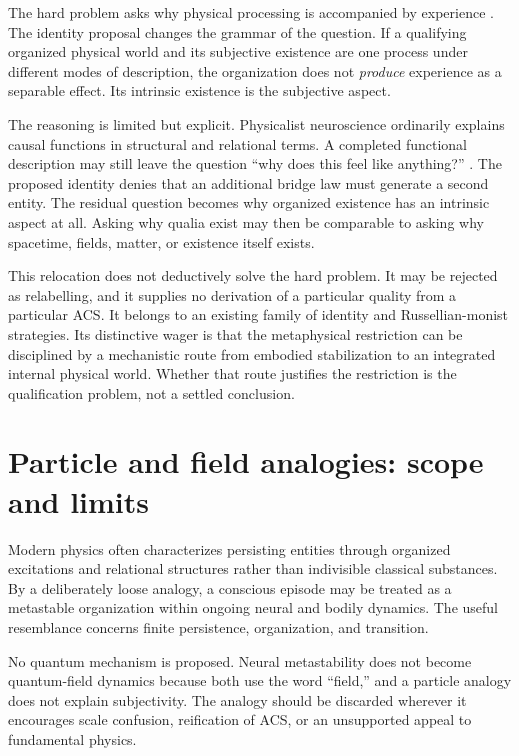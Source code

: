 \documentclass[
  11pt,
  a4paper,
]{article}
\begin{document}
The hard problem asks why physical processing is accompanied by
experience \citep{chalmers1996}. The identity proposal changes the
grammar of the question. If a qualifying organized physical world and
its subjective existence are one process under different modes of
description, the organization does not \emph{produce} experience as a
separable effect. Its intrinsic existence is the subjective aspect.

The reasoning is limited but explicit. Physicalist neuroscience
ordinarily explains causal functions in structural and relational terms.
A completed functional description may still leave the question ``why
does this feel like anything?'' \citep{nagel1974}. The proposed identity
denies that an additional bridge law must generate a second entity. The
residual question becomes why organized existence has an intrinsic
aspect at all. Asking why qualia exist may then be comparable to asking
why spacetime, fields, matter, or existence itself exists.

This relocation does not deductively solve the hard problem. It may be
rejected as relabelling, and it supplies no derivation of a particular
quality from a particular ACS. It belongs to an existing family of
identity and Russellian-monist strategies. Its distinctive wager is that
the metaphysical restriction can be disciplined by a mechanistic route
from embodied stabilization to an integrated internal physical world.
Whether that route justifies the restriction is the qualification
problem, not a settled conclusion.

\section{Particle and field analogies: scope and
limits}\label{particle-and-field-analogies-scope-and-limits}

Modern physics often characterizes persisting entities through organized
excitations and relational structures rather than indivisible classical
substances. By a deliberately loose analogy, a conscious episode may be
treated as a metastable organization within ongoing neural and bodily
dynamics. The useful resemblance concerns finite persistence,
organization, and transition.

No quantum mechanism is proposed. Neural metastability does not become
quantum-field dynamics because both use the word ``field,'' and a
particle analogy does not explain subjectivity. The analogy should be
discarded wherever it encourages scale confusion, reification of ACS, or
an unsupported appeal to fundamental physics.
\end{document}
